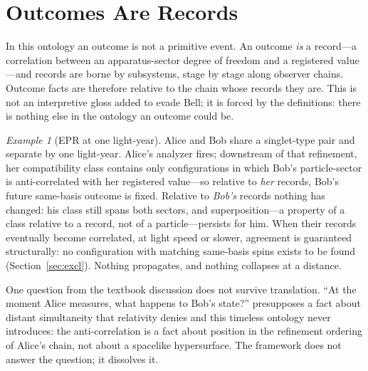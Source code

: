 \documentclass[11pt]{article}
\theoremstyle{definition}
\theoremstyle{remark}
\newtheorem*{example*}{Example}
\begin{document}
\section{Outcomes Are Records}\label{sec:outcomes}
In this ontology an outcome is not a primitive event. An outcome \emph{is} a record---a correlation between an apparatus-sector degree of freedom and a registered value---and records are borne by subsystems, stage by stage along observer chains. Outcome facts are therefore relative to the chain whose records they are. This is not an interpretive gloss added to evade Bell; it is forced by the definitions: there is nothing else in the ontology an outcome could be.

\begin{example*}[EPR at one light-year]
Alice and Bob share a singlet-type pair and separate by one light-year. Alice's analyzer fires; downstream of that refinement, her compatibility class contains only configurations in which Bob's particle-sector is anti-correlated with her registered value---so relative to \emph{her} records, Bob's future same-basis outcome is fixed. Relative to \emph{Bob's} records nothing has changed: his class still spans both sectors, and superposition---a property of a class relative to a record, not of a particle---persists for him. When their records eventually become correlated, at light speed or slower, agreement is guaranteed structurally: no configuration with matching same-basis spins exists to be found (Section~\ref{sec:excl}). Nothing propagates, and nothing collapses at a distance.

One question from the textbook discussion does not survive translation. ``At the moment Alice measures, what happens to Bob's state?'' presupposes a fact about distant simultaneity that relativity denies and this timeless ontology never introduces: the anti-correlation is a fact about position in the refinement ordering of Alice's chain, not about a spacelike hypersurface. The framework does not answer the question; it dissolves it.
\end{example*}
\end{document}
